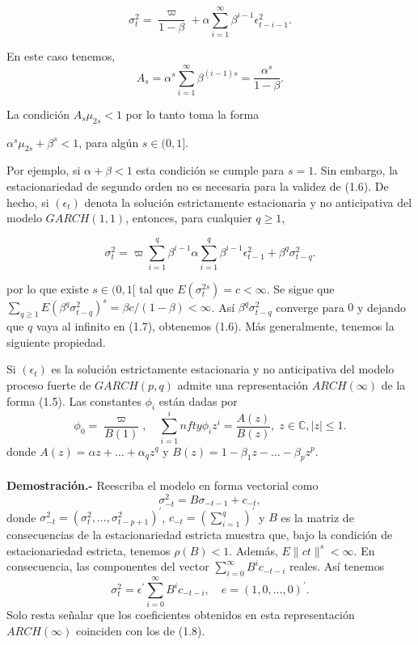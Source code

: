 \begin{equation}
    \sigma_t^2 = \dfrac{\varpi}{1-\beta}  + \alpha \sum_{i=1}^\infty \beta^{i-1} \epsilon_{t-i-1}^2.
\end{equation}

En este caso tenemos,
$$A_s = \alpha^s \sum_{i=1}^\infty \beta^{(i-1)s}=\dfrac{\alpha^s}{1-\beta}.$$

La condición $A_s \mu_{2s}<1$ por lo tanto toma la forma 

\begin{center}
    $\alpha^s\mu_{2s} + \beta^s < 1$, para algún $s\in (0,1]$.
\end{center}

Por ejemplo, si $\alpha +\beta <1$ esta condición se cumple para $s = 1$. Sin embargo, la estacionariedad de segundo orden no es necesaria para la validez de (1.6). De hecho, si $(\epsilon_t )$ denota la solución estrictamente estacionaria y no anticipativa del modelo $GARCH(1, 1)$, entonces, para cualquier $q\geq1$,

\begin{equation}
    \sigma_t^2 = \varpi \sum_{i=1}^q \beta^{i-1} \alpha \sum_{i=1}^q \beta^{i-1} \epsilon_{t-1}^2 + \beta^q \sigma^2_{t-q}.
\end{equation}

por lo que existe $s\in (0,1[$ tal que $E(\sigma_t^{2s}) = c< \infty$. Se sigue que $\sum_{q\geq 1} E(\beta^q \sigma^2_{t-q})^s = \beta c / (1-\beta)<\infty$. Así $\beta^q \sigma^2_{t-q}$ converge para $0$ y dejando que $q$ vaya al infinito en (1.7), obtenemos (1.6). Más generalmente, tenemos la siguiente propiedad.\\

\begin{teo}
    Si $(\epsilon_t)$ es la solución estrictamente estacionaria y no anticipativa del modelo proceso fuerte de $GARCH(p,q)$ admite una representación $ARCH(\infty)$ de la forma (1.5). Las constantes $\phi_i$ están dadas por
    \begin{equation}
	\phi_0 = \dfrac{\varpi}{B(1)}, \quad \sum_{i=1}^infty \phi_i z^i = \dfrac{A(z)}{B(z)}, \; z \in \mathbb{C}, |z| \leq 1.
    \end{equation}
    donde $A(z) = \alpha z + \ldots  + \alpha_q z^q$ y $B(z)=1 - \beta_1 z - \ldots - \beta_p z^p$.\\\\
	\textbf{Demostración.-\;} Reescriba el modelo en forma vectorial como
	$$\sigma_{-t}^2 = B\sigma_{-t-1}+c_{-t},$$
	donde $\sigma_{-t}^2 = (\sigma_t^2, \ldots , \sigma^2_{t-p+1})^{'}$, $c_{-t} = \left(\sum_{i=1}^q\right)^{'}$ y $B$ es la matriz de consecuencias de la estacionariedad estricta muestra que, bajo la condición de estacionariedad estricta, tenemos $\rho(B)<1$. Además, $E\|ct\|^s < \infty$. En consecuencia, las componentes del vector $\sum_{i=0}^\infty B^i c_{-t-i}$ reales. Así tenemos
	$$\sigma_t^2 = \epsilon^{'}\sum_{i=0}^\infty B^i c_{-t-i},\quad e = (1,0,\ldots,0)^{'}.$$
	Solo resta señalar que los coeficientes obtenidos en esta representación $ARCH(\infty)$ coinciden con los de (1.8).\\\\
\end{teo}

